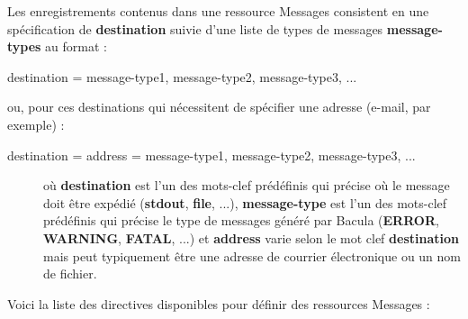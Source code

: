 Les enregistrements contenus dans une ressource Messages consistent en une 
sp\'ecification de  {\bf destination} suivie d'une liste de types de messages 
{\bf message-types} au format :

\begin{description}

\item [destination = message-type1, message-type2, message-type3, ...  ]
   \end{description}

ou, pour ces destinations qui n\'ecessitent de sp\'ecifier une adresse (e-mail, par exemple) :

\begin{description}

\item [destination = address = message-type1, message-type2,
   message-type3, ...  ]

o\`u {\bf destination} est l'un des mots-clef pr\'ed\'efinis qui pr\'ecise o\`u le message 
doit \^etre exp\'edi\'e ({\bf stdout}, {\bf file}, ...), {\bf  message-type} est l'un des 
mots-clef pr\'ed\'efinis qui pr\'ecise le type de messages g\'en\'er\'e par Bacula ({\bf ERROR}, 
{\bf WARNING}, {\bf FATAL}, ...) et {\bf address} varie selon le mot clef  {\bf destination} 
mais peut typiquement \^etre une adresse de courrier \'electronique ou un nom de fichier.

\end{description}

Voici la liste des directives disponibles pour d\'efinir des ressources Messages :


